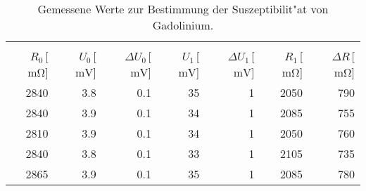 
\begin{table}[!h]
\begin{center}
\begin{tabular}{|r|r|r|r|r|r|r|}
\hline
&&&&&&\\
$R_\mathrm{0}$\,[$\SI{}{\milli\ohm}$] & $U_\mathrm{0}$\,[$\SI{}{\milli\volt}$] & $\Delta U_\mathrm{0}$\,[$\SI{}{\milli\volt}$] & $U_\mathrm{1}$\,[$\SI{}{\milli\volt}$] & $\Delta U_\mathrm{1}$\,[$\SI{}{\milli\volt}$] & $R_\mathrm{1}$\,[$\SI{}{\milli\ohm}$] & $\Delta R$\,[$\SI{}{\milli\ohm}$]\\
\hline
\hline

2840 & 3.8 &	0.1 & 35 & 1 & 2050 & 790 \\
2840 & 3.9 &	0.1 & 34 & 1 & 2085 & 755 \\
2810 & 3.9 &	0.1 & 34 & 1 & 2050 & 760 \\
2840 & 3.8 &	0.1 & 33 & 1 & 2105 & 735 \\
2865 & 3.9 &	0.1 & 35 & 1 & 2085 & 780 \\

\hline
\end{tabular}
\caption[Messwerte zu Aufgabenteil b]{Gemessene Werte zur Bestimmung der Suszeptibilit"at von Gadolinium.}
\label{tabelle:aufgabe_b_Gd}
\end{center}
\end{table}